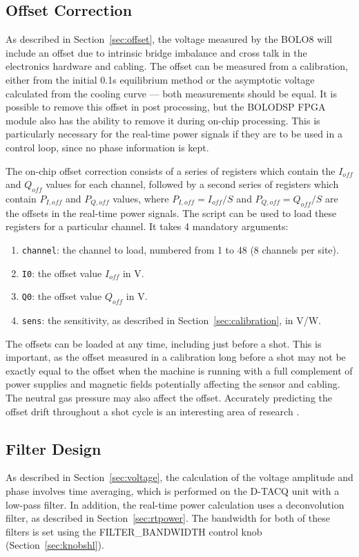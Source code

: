 \documentclass[12pt,a4paper]{article}
\begin{document}
\subsection{Offset Correction}
\label{sec:offset_correction}
As described in Section~\ref{sec:offset}, the voltage measured by the BOLO8 will include an offset due to intrinsic bridge imbalance and cross talk in the
electronics hardware and cabling. The offset can be measured from a calibration, either from the initial 0.1s equilibrium method or the asymptotic voltage
calculated from the cooling curve --- both measurements should be equal. It is possible to remove this offset in post processing, but the BOLODSP FPGA
module also has the ability to remove it during on-chip processing. This is particularly necessary for the real-time power signals if they are to be used
in a control loop, since no phase information is kept.

The on-chip offset correction consists of a series of registers which contain the $I_{off}$ and $Q_{off}$ values for each channel, followed by a second
series of registers which contain $P_{I,off}$ and $P_{Q,off}$ values, where $P_{I,off} = I_{off}/S$ and $P_{Q,off} = Q_{off}/S$ are the offsets in the
real-time power signals. The script \mbox{} can be used to load these registers for a particular channel. It
takes 4 mandatory arguments:
\begin{enumerate}
\item{\texttt{channel}: the channel to load, numbered from 1 to 48 (8 channels per site).}
\item{\texttt{I0}: the offset value $I_{off}$ in V.}
\item{\texttt{Q0}: the offset value $Q_{off}$ in V.}
\item{\texttt{sens}: the sensitivity, as described in Section~\ref{sec:calibration}, in V/W.}
\end{enumerate}

The offsets can be loaded at any time, including just before a shot. This is important, as the offset measured in a calibration long before a shot may not
be exactly equal to the offset when the machine is running with a full complement of power supplies and magnetic fields potentially affecting the sensor
and cabling. The neutral gas pressure may also affect the offset. Accurately predicting the offset drift throughout a shot cycle is an interesting area of
research \cite{zhang-2012}.

\subsection{Filter Design}
\label{sec:lpfdesign}
As described in Section~\ref{sec:voltage}, the calculation of the voltage amplitude and phase involves time averaging, which is performed on the D-TACQ
unit with a low-pass filter. In addition, the real-time power calculation uses a deconvolution filter, as described in Section~\ref{sec:rtpower}. The
bandwidth for both of these filters is set using the FILTER{\_}BANDWIDTH control knob (Section~\ref{sec:knobshl}).
\end{document}
